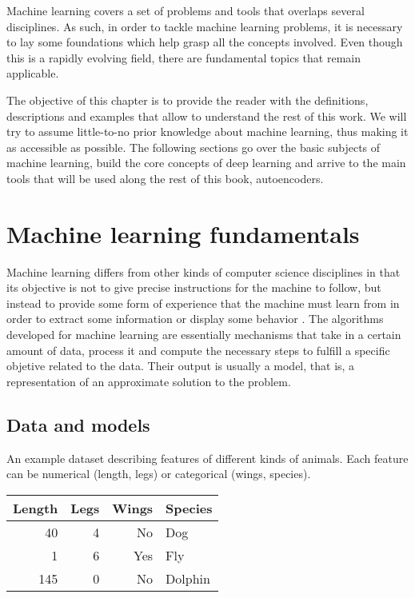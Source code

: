 
Machine learning covers a set of problems and tools that overlaps several disciplines. As such, in order to tackle machine learning problems, it is necessary to lay some foundations which help grasp all the concepts involved. Even though this is a rapidly evolving field, there are fundamental topics that remain applicable.

The objective of this chapter is to provide the reader with the definitions, descriptions and examples that allow to understand the rest of this work. We will try to assume little-to-no prior knowledge about machine learning, thus making it as accessible as possible. The following sections go over the basic subjects of machine learning, build the core concepts of deep learning and arrive to the main tools that will be used along the rest of this book, autoencoders.

\section{Machine learning fundamentals}

Machine learning differs from other kinds of computer science disciplines in that its objective is not to give precise instructions for the machine to follow, but instead to provide some form of experience that the machine must learn from in order to extract some information or display some behavior . The algorithms developed for machine learning are essentially mechanisms that take in a certain amount of data, process it and compute the necessary steps to fulfill a specific objetive related to the data. Their output is usually a model, that is, a representation of an approximate solution to the problem. 
 
\subsection{Data and models}

\begin{margintable}
\caption{\label{tbl:dataset}An example dataset describing features of different kinds of animals. Each feature can be numerical (length, legs) or categorical (wings, species).}\footnotesize
\begin{tabular}{rrrl}\toprule
Length & Legs & Wings & Species\\\midrule
40 & 4 & No & Dog\\
1 & 6 & Yes & Fly\\
145 & 0 & No & Dolphin\\\bottomrule
\end{tabular}
\end{margintable}

